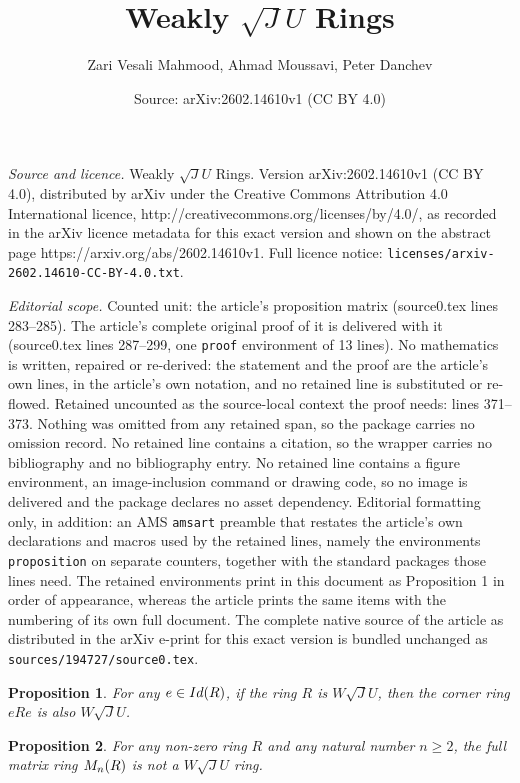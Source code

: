\documentclass[10pt,a4paper]{amsart}
\title{Weakly $\sqrt{J}U$ Rings}
\author{Zari Vesali Mahmood, Ahmad Moussavi, Peter Danchev}
\date{Source: arXiv:2602.14610v1 (CC BY 4.0)}
\newtheorem{proposition}{Proposition}
\begin{document}
\maketitle

\noindent\emph{Source and licence.} Weakly $\sqrt{J}U$ Rings. Version arXiv:2602.14610v1 (CC BY 4.0), distributed by arXiv under the Creative Commons Attribution 4.0 International licence, http://creativecommons.org/licenses/by/4.0/, as recorded in the arXiv licence metadata for this exact version and shown on the abstract page https://arxiv.org/abs/2602.14610v1. Full licence notice: \texttt{licenses/arxiv-2602.14610-CC-BY-4.0.txt}.\par\smallskip

\noindent\textit{Editorial scope.} Counted unit: the article's proposition matrix (source0.tex lines 283--285). The article's complete original proof of it is delivered with it (source0.tex lines 287--299, one \texttt{proof} environment of 13 lines). No mathematics is written, repaired or re-derived: the statement and the proof are the article's own lines, in the article's own notation, and no retained line is substituted or re-flowed.  Retained uncounted as the source-local context the proof needs: lines 371--373.  Nothing was omitted from any retained span, so the package carries no omission record.  No retained line contains a citation, so the wrapper carries no bibliography and no bibliography entry.  No retained line contains a figure environment, an image-inclusion command or drawing code, so no image is delivered and the package declares no asset dependency.  Editorial formatting only, in addition: an AMS \texttt{amsart} preamble that restates the article's own declarations and macros used by the retained lines, namely the environments \texttt{proposition} on separate counters, together with the standard packages those lines need.  The retained environments print in this document as Proposition 1 in order of appearance, whereas the article prints the same items with the numbering of its own full document.  The complete native source of the article as distributed in the arXiv e-print for this exact version is bundled unchanged as \texttt{sources/194727/source0.tex}.
\begin{proposition}\label{corner} For any \( e \in {\rm Id}(R) \), if the ring \( R \) is $W\sqrt{J}U$, then
the corner ring \( eRe \) is also $W\sqrt{J}U$.
\end{proposition}

\begin{proposition}\label{matrix} For any non-zero ring \( R \) and any natural number \( n \geq 2 \), the full
matrix ring \( {\rm M}_n(R) \) is not a $W\sqrt{J}U$ ring.
\end{proposition}
\end{document}
